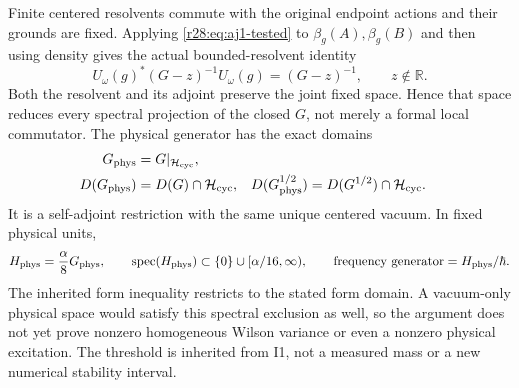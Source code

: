 Finite centered resolvents commute with the original endpoint actions and their grounds are fixed. Applying \eqref{r28:eq:aj1-tested} to $\beta_g(A),\beta_g(B)$ and then using density gives the actual bounded-resolvent identity
\begin{equation}
 U_\omega(g)^*(G-z)^{-1}U_\omega(g)=(G-z)^{-1},
 \qquad z\notin\mathbb R.
 \label{r28:eq:aj1-resolvent}
\end{equation}
Both the resolvent and its adjoint preserve the joint fixed space. Hence that space reduces every spectral projection of the closed $G$, not merely a formal local commutator. The physical generator has the exact domains
\begin{align}
 G_{\rm phys}&=G|_{\mathcal H_{\rm cyc}},\notag\\
 D(G_{\rm phys})&=D(G)\cap\mathcal H_{\rm cyc},
 &D(G_{\rm phys}^{1/2})&=D(G^{1/2})\cap\mathcal H_{\rm cyc}.
 \label{r28:eq:aj1-domains}
\end{align}
It is a self-adjoint restriction with the same unique centered vacuum. In fixed physical units,
\begin{equation}
 H_{\rm phys}=\frac\alpha8G_{\rm phys},\qquad
 \operatorname{spec}(H_{\rm phys})\subset\{0\}\cup[\alpha/16,\infty),
 \qquad\text{frequency generator}=H_{\rm phys}/\hbar.
\end{equation}
The inherited form inequality restricts to the stated form domain. A vacuum-only physical space would satisfy this spectral exclusion as well, so the argument does not yet prove nonzero homogeneous Wilson variance or even a nonzero physical excitation. The threshold is inherited from I1, not a measured mass or a new numerical stability interval.

